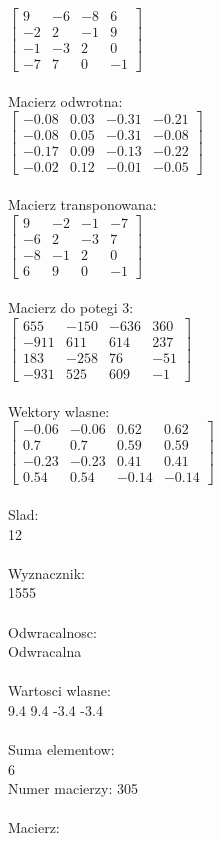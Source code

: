 \documentclass[a4paper,12pt]{article}
\begin{document}
$\begin{bmatrix} 9&-6&-8&6\\-2&2&-1&9\\-1&-3&2&0\\-7&7&0&-1 \end{bmatrix}$
\\
\\
Macierz odwrotna:\\

$\begin{bmatrix} -0.08&0.03&-0.31&-0.21\\-0.08&0.05&-0.31&-0.08\\-0.17&0.09&-0.13&-0.22\\-0.02&0.12&-0.01&-0.05 \end{bmatrix}$
\\
\\
Macierz transponowana:\\

$\begin{bmatrix} 9&-2&-1&-7\\-6&2&-3&7\\-8&-1&2&0\\6&9&0&-1 \end{bmatrix}$
\\
\\
Macierz do potegi 3:\\

$\begin{bmatrix} 655&-150&-636&360\\-911&611&614&237\\183&-258&76&-51\\-931&525&609&-1 \end{bmatrix}$
\\
\\
Wektory wlasne:\\

$\begin{bmatrix} -0.06&-0.06&0.62&0.62\\0.7&0.7&0.59&0.59\\-0.23&-0.23&0.41&0.41\\0.54&0.54&-0.14&-0.14 \end{bmatrix}$
\\
\\
Slad:\\
12
\\
\\
Wyznacznik:\\
1555
\\
\\
Odwracalnosc:\\
Odwracalna
\\
\\
Wartosci wlasne:\\
9.4 9.4 -3.4 -3.4
\\
\\
Suma elementow:\\
6
\\
\newpage
Numer macierzy:
305
\\
\\
Macierz:\\
\end{document}
